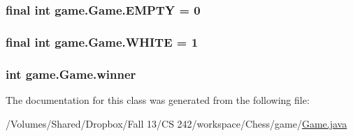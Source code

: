 \hypertarget{classgame_1_1_game_a787b82f6054bed8334222d3aef9179e5}{
\subsubsection[{E\-M\-P\-T\-Y}]{\setlength{\rightskip}{0pt plus 5cm}final int game.\-Game.\-E\-M\-P\-T\-Y = 0\hspace{0.3cm}{\ttfamily [static]}}}\label{classgame_1_1_game_a787b82f6054bed8334222d3aef9179e5}
\hypertarget{classgame_1_1_game_ac15f5930449e1e16d9b7d4dd10b9c957}{
\subsubsection[{W\-H\-I\-T\-E}]{\setlength{\rightskip}{0pt plus 5cm}final int game.\-Game.\-W\-H\-I\-T\-E = 1\hspace{0.3cm}{\ttfamily [static]}}}\label{classgame_1_1_game_ac15f5930449e1e16d9b7d4dd10b9c957}
\hypertarget{classgame_1_1_game_aa55030dc8792bb216e934ca6a7d389fb}{
\subsubsection[{winner}]{\setlength{\rightskip}{0pt plus 5cm}int game.\-Game.\-winner\hspace{0.3cm}{\ttfamily [private]}}}\label{classgame_1_1_game_aa55030dc8792bb216e934ca6a7d389fb}


The documentation for this class was generated from the following file\-:\begin{DoxyCompactItemize}
\item 
/\-Volumes/\-Shared/\-Dropbox/\-Fall 13/\-C\-S 242/workspace/\-Chess/game/\hyperlink{_game_8java}{Game.\-java}\end{DoxyCompactItemize}

